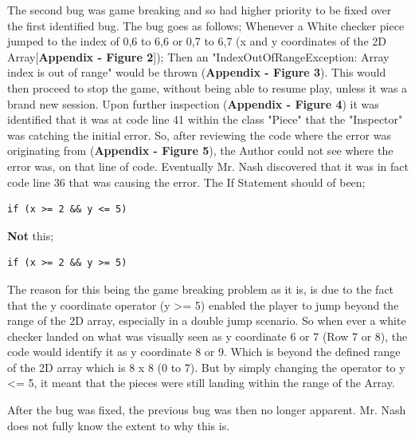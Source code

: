 \documentclass[10pt, a4paper]{article}
\begin{document}
	 The second bug was game breaking and so had higher priority to be fixed over the first identified bug. The bug goes as follows; Whenever a White checker piece jumped to the index of 0,6 to 6,6 or 0,7 to 6,7 (x and y coordinates of the 2D Array[\textbf{Appendix - Figure 2}]); Then an "IndexOutOfRangeException: Array index is out of range" would be thrown (\textbf{Appendix - Figure 3}). This would then proceed to stop the game, without being able to resume play, unless it was a brand new session. Upon further inspection (\textbf{Appendix - Figure 4}) it was identified that it was at code line 41 within the class "Piece" that the "Inspector" was catching the initial error. So, after reviewing the code where the error was originating from (\textbf{Appendix - Figure 5}), the Author could not see where the error was, on that line of code. Eventually Mr. Nash discovered that it was in fact code line 36 that was causing the error. The If Statement should of been;
	 \begin{lstlisting}[caption = ForcedMove()]
	 if (x >= 2 && y <= 5)
	 \end{lstlisting}
	 \textbf{Not} this;
	 \begin{lstlisting}[caption = ForcedMove()]
	 if (x >= 2 && y >= 5)
	 \end{lstlisting}
	 The reason for this being the game breaking problem as it is, is due to the fact that the y coordinate operator (y >= 5) enabled the player to jump beyond the range of the 2D array, especially in a double jump scenario. So when ever a white checker landed on what was visually seen as y coordinate 6 or 7 (Row 7 or 8), the code would identify it as y coordinate 8 or 9. Which is beyond the defined range of the 2D array which is 8 x 8 (0 to 7). But by simply changing the operator to y <= 5, it meant that the pieces were still landing within the range of the Array.
	 
	 After the bug was fixed, the previous bug was then no longer apparent. Mr. Nash does not fully know the extent to why this is.
\\	 	
\\	  
\\	 
\\
\\
\\
\\
\\
\\
\\
\\
\\
\\
\\
\\
\\
\\
\\
\\
\\
\\
\\
\\
\\
\\
\\
\\
\appendix
\end{document}
